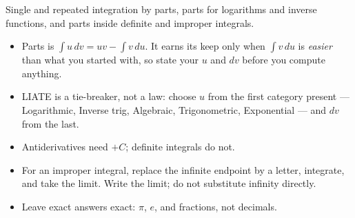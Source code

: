 \documentclass[12pt]{article}
\begin{document}

\noindent\small
Single and repeated integration by parts, parts for logarithms and inverse
functions, and parts inside definite and improper integrals.
\begin{itemize}[leftmargin=0.7cm, itemsep=1pt, topsep=2pt]
  \item Parts is $\displaystyle\int u\,dv = uv - \int v\,du$. It earns its keep
        only when $\int v\,du$ is \emph{easier} than what you started with, so
        state your $u$ and $dv$ before you compute anything.
  \item LIATE is a tie-breaker, not a law: choose $u$ from the first category
        present --- Logarithmic, Inverse trig, Algebraic, Trigonometric,
        Exponential --- and $dv$ from the last.
  \item Antiderivatives need $+ C$; definite integrals do not.
  \item For an improper integral, replace the infinite endpoint by a letter,
        integrate, and take the limit. Write the limit; do not substitute
        infinity directly.
  \item Leave exact answers exact: $\pi$, $e$, and fractions, not decimals.
\end{itemize}
\normalsize
\vspace{0.2cm}







\end{document}
